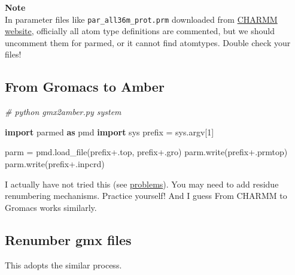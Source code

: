 \documentclass[
]{article}
\newenvironment{Shaded}{}{}
\newcommand{\CommentTok}[1]{\textcolor[rgb]{0.38,0.63,0.69}{\textit{#1}}}
\newcommand{\DecValTok}[1]{\textcolor[rgb]{0.25,0.63,0.44}{#1}}
\newcommand{\ImportTok}[1]{\textcolor[rgb]{0.00,0.50,0.00}{\textbf{#1}}}
\newcommand{\NormalTok}[1]{#1}
\newcommand{\OperatorTok}[1]{\textcolor[rgb]{0.40,0.40,0.40}{#1}}
\newcommand{\StringTok}[1]{\textcolor[rgb]{0.25,0.44,0.63}{#1}}
\begin{document}
\textbf{Note}\\

In parameter files like \texttt{par\_all36m\_prot.prm} downloaded from
\href{http://mackerell.umaryland.edu/charmm_ff.shtml}{CHARMM website},
officially all atom type definitions are commented, but we should
uncomment them for parmed, or it cannot find atomtypes. Double check
your files!

\hypertarget{from-gromacs-to-amber}{%
\subsection{From Gromacs to Amber}\label{from-gromacs-to-amber}}

\begin{Shaded}
\begin{Highlighting}[]
\CommentTok{\# python gmx2amber.py system}

\ImportTok{import}\NormalTok{ parmed }\ImportTok{as}\NormalTok{ pmd}
\ImportTok{import}\NormalTok{ sys}
\NormalTok{prefix }\OperatorTok{=}\NormalTok{ sys.argv[}\DecValTok{1}\NormalTok{]}

\NormalTok{parm }\OperatorTok{=}\NormalTok{ pmd.load\_file(prefix}\OperatorTok{+}\StringTok{\textquotesingle{}.top\textquotesingle{}}\NormalTok{, prefix}\OperatorTok{+}\StringTok{\textquotesingle{}.gro\textquotesingle{}}\NormalTok{)}
\NormalTok{parm.write(prefix}\OperatorTok{+}\StringTok{\textquotesingle{}.prmtop\textquotesingle{}}\NormalTok{)}
\NormalTok{parm.write(prefix}\OperatorTok{+}\StringTok{\textquotesingle{}.inpcrd\textquotesingle{}}\NormalTok{)}
\end{Highlighting}
\end{Shaded}

I actually have not tried this (see
\protect\hyperlink{problems}{problems}). You may need to add residue
renumbering mechanisms. Practice yourself! And I guess From CHARMM to
Gromacs works similarly.

\hypertarget{renumber-gmx-files}{%
\subsection{Renumber gmx files}\label{renumber-gmx-files}}

This adopts the similar process.
\end{document}
